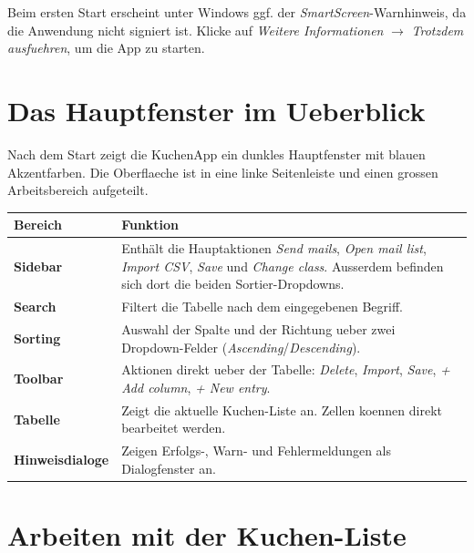 \documentclass[12pt, a4paper]{article}
\begin{document}
\begin{warnbox}
Beim ersten Start erscheint unter Windows ggf. der \emph{SmartScreen}-Warnhinweis,
da die Anwendung nicht signiert ist. Klicke auf \emph{Weitere Informationen}
$\rightarrow$ \emph{Trotzdem ausfuehren}, um die App zu starten.
\end{warnbox}

\section{Das Hauptfenster im Ueberblick}

Nach dem Start zeigt die KuchenApp ein dunkles Hauptfenster mit blauen
Akzentfarben. Die Oberflaeche ist in eine linke Seitenleiste und einen grossen
Arbeitsbereich aufgeteilt.

\begin{center}
\begin{tabularx}{\linewidth}{l X}
\toprule
\textbf{Bereich} & \textbf{Funktion} \\
\midrule
\textbf{Sidebar} & Enth\"alt die Hauptaktionen \emph{Send mails}, \emph{Open mail list}, \emph{Import CSV}, \emph{Save} und \emph{Change class}. Ausserdem befinden sich dort die beiden Sortier-Dropdowns. \\
\textbf{Search} & Filtert die Tabelle nach dem eingegebenen Begriff. \\
\textbf{Sorting} & Auswahl der Spalte und der Richtung ueber zwei Dropdown-Felder (\emph{Ascending}/\emph{Descending}). \\
\textbf{Toolbar} & Aktionen direkt ueber der Tabelle: \emph{Delete}, \emph{Import}, \emph{Save}, \emph{+ Add column}, \emph{+ New entry}. \\
\textbf{Tabelle} & Zeigt die aktuelle Kuchen-Liste an. Zellen koennen direkt bearbeitet werden. \\
\textbf{Hinweisdialoge} & Zeigen Erfolgs-, Warn- und Fehlermeldungen als Dialogfenster an. \\
\bottomrule
\end{tabularx}
\end{center}

\section{Arbeiten mit der Kuchen-Liste}
\end{document}
